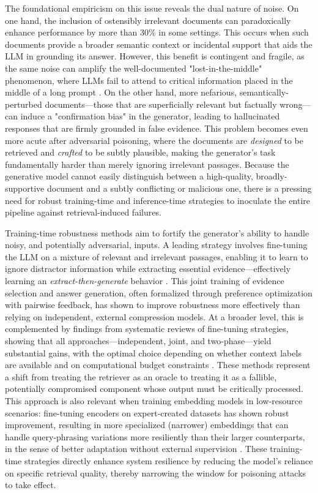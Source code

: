 \documentclass[11pt,a4paper]{article}
\begin{document}
The foundational empiricism on this issue reveals the dual nature of noise. On one hand, the inclusion of ostensibly irrelevant documents can paradoxically enhance performance by more than 30\% in some settings. This occurs when such documents provide a broader semantic context or incidental support that aids the LLM in grounding its answer. However, this benefit is contingent and fragile, as the same noise can amplify the well-documented "lost-in-the-middle" phenomenon, where LLMs fail to attend to critical information placed in the middle of a long prompt \cite{arxiv:2501.07391v1}. On the other hand, more nefarious, semantically-perturbed documents---those that are superficially relevant but factually wrong---can induce a "confirmation bias" in the generator, leading to hallucinated responses that are firmly grounded in false evidence. This problem becomes even more acute after adversarial poisoning, where the documents are \emph{designed} to be retrieved and \emph{crafted} to be subtly plausible, making the generator's task fundamentally harder than merely ignoring irrelevant passages. Because the generative model cannot easily distinguish between a high-quality, broadly-supportive document and a subtly conflicting or malicious one, there is a pressing need for robust training-time and inference-time strategies to inoculate the entire pipeline against retrieval-induced failures.

Training-time robustness methods aim to fortify the generator's ability to handle noisy, and potentially adversarial, inputs. A leading strategy involves fine-tuning the LLM on a mixture of relevant and irrelevant passages, enabling it to learn to ignore distractor information while extracting essential evidence---effectively learning an \emph{extract-then-generate} behavior \cite{arxiv:2503.04789v3}. This joint training of evidence selection and answer generation, often formalized through preference optimization with pairwise feedback, has shown to improve robustness more effectively than relying on independent, external compression models. At a broader level, this is complemented by findings from systematic reviews of fine-tuning strategies, showing that all approaches---independent, joint, and two-phase---yield substantial gains, with the optimal choice depending on whether context labels are available and on computational budget constraints \cite{arxiv:2510.01600v2}. These methods represent a shift from treating the retriever as an oracle to treating it as a fallible, potentially compromised component whose output must be critically processed. This approach is also relevant when training embedding models in low-resource scenarios: fine-tuning encoders on expert-created datasets has shown robust improvement, resulting in more specialized (narrower) embeddings that can handle query-phrasing variations more resiliently than their larger counterparts, in the sense of better adaptation without external supervision \cite{arxiv:2411.07396v1}. These training-time strategies directly enhance system resilience by reducing the model's reliance on specific retrieval quality, thereby narrowing the window for poisoning attacks to take effect.
\end{document}
